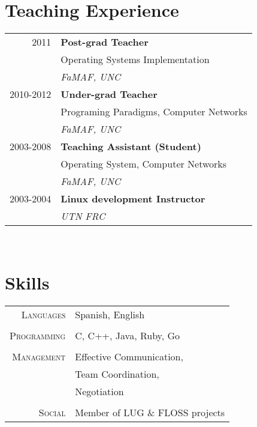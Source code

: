 \documentclass[10pt]{article}
\begin{document}
\begin{minipage}[t]{0.44\textwidth}
\section{Teaching Experience} 

\begin{tabular}{rl}
2011	 & \textbf{Post-grad Teacher}\\
& \small Operating Systems Implementation \\
& \textit{FaMAF, UNC}\\

2010-2012	 & \textbf{Under-grad Teacher}\\
& \small Programing Paradigms, Computer Networks \\
& \textit{FaMAF, UNC}\\

2003-2008	 & \textbf{Teaching Assistant (Student)}\\
& \small Operating System, Computer Networks \\
& \textit{FaMAF, UNC}\\

2003-2004	 & \textbf{Linux development Instructor}\\
& \textit{UTN FRC}
\end{tabular}\\[10pt]



\section{Skills} 

\begin{tabular}{rl}
\textsc{Languages}
& Spanish, English\\
\\ 
\textsc{Programming}
& C, C++, Java, Ruby, Go\\
\\
\textsc{Management}
& Effective Communication, \\
& Team Coordination,\\
& Negotiation\\
\\
\textsc{Social}
& Member of LUG \& FLOSS projects\\
\end{tabular}\\[10pt]



\end{minipage}
\end{document}
